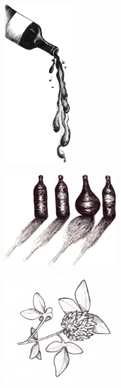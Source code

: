 $  $%
%

\begin{figure}[!b]
\begin{center}
\includegraphics[width=3cm]{../bilder/vinet.jpg} 
\end{center}
\end{figure}
\sclearpage

\sclearpage

\sclearpage

\begin{figure}[!b]
\begin{center}
\includegraphics[width=5cm]{../bilder/flaskor.jpg} 
\end{center}
\end{figure}
\sclearpage

\begin{figure}[!b]
\begin{center}
\includegraphics[width=5cm]{../bilder/klover.jpg} 
\end{center}
\end{figure}

